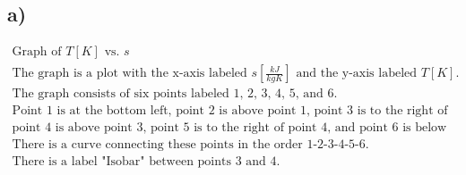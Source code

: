 

\subsection*{a)}

\[
\begin{array}{c}
\text{Graph of } T[K] \text{ vs. } s \\
\text{The graph is a plot with the x-axis labeled } s \left[ \frac{kJ}{kgK} \right] \text{ and the y-axis labeled } T[K]. \\
\text{The graph consists of six points labeled 1, 2, 3, 4, 5, and 6.} \\
\text{Point 1 is at the bottom left, point 2 is above point 1, point 3 is to the right of point 2,} \\
\text{point 4 is above point 3, point 5 is to the right of point 4, and point 6 is below point 5.} \\
\text{There is a curve connecting these points in the order 1-2-3-4-5-6.} \\
\text{There is a label "Isobar" between points 3 and 4.}
\end{array}
\]